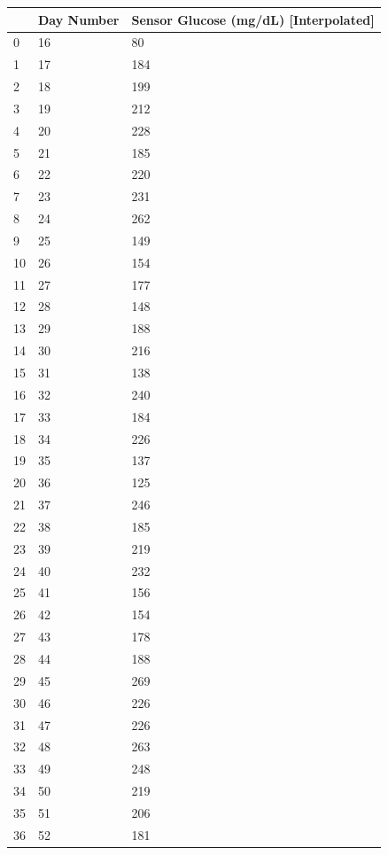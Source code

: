 \bigskip\noindent
\begin{tabular}{p{}p{}p{}}
\toprule
 & Day Number & Sensor Glucose (mg/dL) [Interpolated] \\
\hline
0 & 16 & 80 \\
\hline
1 & 17 & 184 \\
\hline
2 & 18 & 199 \\
\hline
3 & 19 & 212 \\
\hline
4 & 20 & 228 \\
\hline
5 & 21 & 185 \\
\hline
6 & 22 & 220 \\
\hline
7 & 23 & 231 \\
\hline
8 & 24 & 262 \\
\hline
9 & 25 & 149 \\
\hline
10 & 26 & 154 \\
\hline
11 & 27 & 177 \\
\hline
12 & 28 & 148 \\
\hline
13 & 29 & 188 \\
\hline
14 & 30 & 216 \\
\hline
15 & 31 & 138 \\
\hline
16 & 32 & 240 \\
\hline
17 & 33 & 184 \\
\hline
18 & 34 & 226 \\
\hline
19 & 35 & 137 \\
\hline
20 & 36 & 125 \\
\hline
21 & 37 & 246 \\
\hline
22 & 38 & 185 \\
\hline
23 & 39 & 219 \\
\hline
24 & 40 & 232 \\
\hline
25 & 41 & 156 \\
\hline
26 & 42 & 154 \\
\hline
27 & 43 & 178 \\
\hline
28 & 44 & 188 \\
\hline
29 & 45 & 269 \\
\hline
30 & 46 & 226 \\
\hline
31 & 47 & 226 \\
\hline
32 & 48 & 263 \\
\hline
33 & 49 & 248 \\
\hline
34 & 50 & 219 \\
\hline
35 & 51 & 206 \\
\hline
36 & 52 & 181 \\

\end{tabular}
